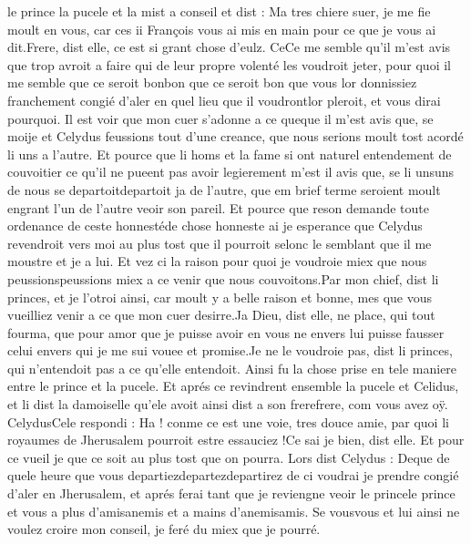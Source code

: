 \documentclass{article}
\begin{document}
\begin{pages}
   le prince la pucele 
   et la mist a conseil et dist :
   Ma tres chiere suer, je me fie moult en vous, car ces ii 
      François vous ai mis en main pour ce que je vous ai dit.Frere, dist elle, ce est si grant chose d’eulz. 
      CeCe me semble qu'il 
      m’est avis que trop avroit a faire qui de leur propre volenté les voudroit jeter, pour quoi il me semble que ce seroit 
      bonbon que ce seroit bon que vous lor 
      donnissiez franchement congié d’aler en quel lieu que il 
      voudrontlor pleroit, et vous dirai pourquoi. 
      Il est voir que mon cuer s’adonne a ce queque il m'est avis que, 
      se moije et Celydus feussions 
   tout d’une creance, que nous serions moult tost acordé li uns a l’autre. Et pource que li homs et la fame si ont naturel entendement 
   de couvoitier ce qu’il ne pueent pas avoir legierement m’est il avis que, se li 
      unsuns de nous 
      se departoitdepartoit ja de l’autre, 
   que em brief terme seroient moult engrant l’un de l’autre veoir son pareil. Et pource que reson demande toute ordenance 
      de ceste honnestéde chose honneste ai je esperance que 
      Celydus revendroit vers moi au plus tost que il pourroit selonc le semblant que il me moustre 
      et je a lui. Et vez ci la raison pour quoi je voudroie miex que nous 
      peussionspeussions miex a ce venir que nous couvoitons.Par mon chief, dist li princes, et je l’otroi ainsi, 
   car moult y a belle raison et bonne, mes que vous vueilliez venir a ce que mon cuer desirre.Ja Dieu, dist elle, ne place, qui tout fourma, que pour amor que je puisse avoir en vous 
   ne envers lui puisse fausser celui envers qui je me sui vouee et promise.Je ne le voudroie pas, dist li princes, 
   qui n’entendoit pas a ce qu’elle entendoit. \pend
\pstart Ainsi fu la chose prise en tele maniere entre 
   le prince et la pucele. Et aprés ce revindrent ensemble 
   la pucele et Celidus, et li dist 
   la damoiselle qu’ele avoit ainsi dist a 
      son frerefrere, com vous avez oÿ. 
   CelydusCele respondi :
   Ha ! conme ce est une voie, tres douce amie, par quoi li royaumes de 
      Jherusalem pourroit estre essauciez !Ce sai je bien, dist elle. Et pour ce vueil je que ce soit au plus tost que on pourra.
   Lors dist Celydus :
   Deque de quele heure que vous 
      departiezdepartezdepartirez de ci voudrai je prendre 
      congié d’aler en Jherusalem, et aprés ferai tant que je reviengne veoir 
      le princele prince et vous
      a plus d’amisanemis et a mains 
      d’anemisamis. Se 
      vousvous et lui 
      ainsi ne voulez croire mon conseil, je feré du miex que je pourré.

\end{pages}
\end{document}
